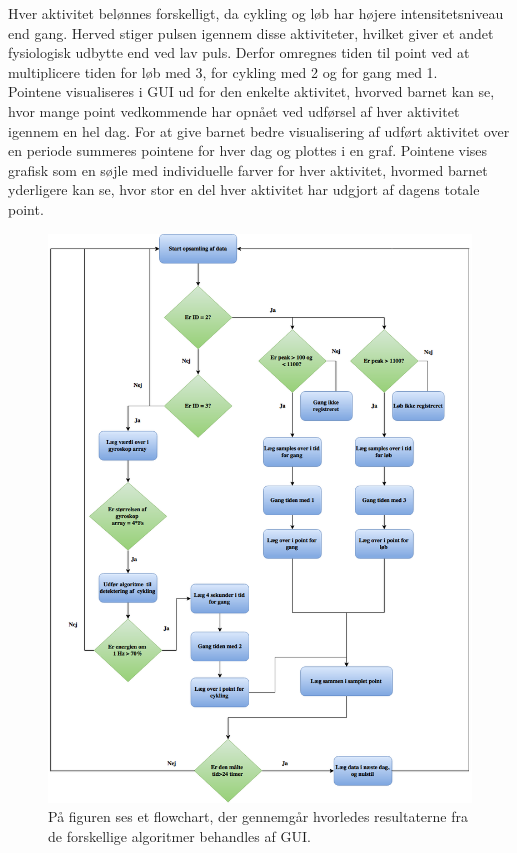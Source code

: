 Hver aktivitet belønnes forskelligt, da cykling og løb har højere intensitetsniveau end gang. Herved stiger pulsen igennem disse aktiviteter, hvilket giver et andet fysiologisk udbytte end ved lav puls. Derfor omregnes tiden til point ved at multiplicere tiden for løb med 3, for cykling med 2 og for gang med 1.\\ 
Pointene visualiseres i GUI ud for den enkelte aktivitet, hvorved barnet kan se, hvor mange point vedkommende har opnået ved udførsel af hver aktivitet igennem en hel dag. For at give barnet bedre visualisering af udført aktivitet over en periode summeres pointene for hver dag og plottes i en graf. Pointene vises grafisk som en søjle med individuelle farver for hver aktivitet, hvormed barnet yderligere kan se, hvor stor en del hver aktivitet har udgjort af dagens totale point.  
\begin{figure}[H]
	\centering
	\includegraphics[scale=0.4]{figures/cDesign/pseudo_GUI.png}
	\caption{På figuren ses et flowchart, der gennemgår hvorledes resultaterne fra de forskellige algoritmer behandles af GUI.}
	\label{fig:GUI}
\end{figure}

